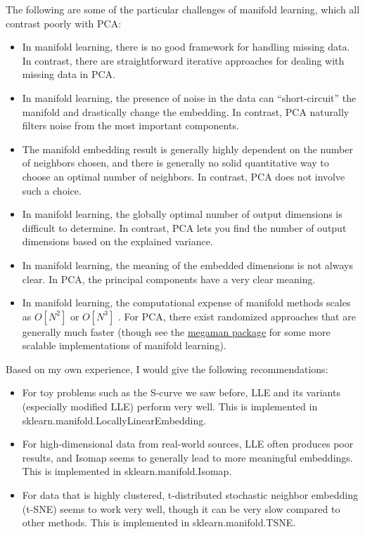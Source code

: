 The following are some of the particular challenges of manifold learning, which all
contrast poorly with PCA:
\begin{itemize}
    \item In manifold learning, there is no good framework for handling missing data. In contrast, there are straightforward iterative approaches for dealing with missing data in PCA.
    \item In manifold learning, the presence of noise in the data can “short-circuit” the manifold and drastically change the embedding. In contrast, PCA naturally filters noise from the most important components.
    \item The manifold embedding result is generally highly dependent on the number of neighbors chosen, and there is generally no solid quantitative way to choose an optimal number of neighbors. In contrast, PCA does not involve such a choice.
    \item In manifold learning, the globally optimal number of output dimensions is difficult to determine. In contrast, PCA lets you find the number of output dimensions based on the explained variance.
    \item In manifold learning, the meaning of the embedded dimensions is not always clear. In PCA, the principal components have a very clear meaning.
    \item In manifold learning, the computational expense of manifold methods scales as $O[N^2]$ or $O[N^3]$ . For PCA, there exist randomized approaches that are generally much faster (though see the \href{https://github.com/mmp2/megaman}{megaman package} for some more scalable implementations of manifold learning).
\end{itemize}

Based on my own experience, I would give the following recommendations:

\begin{itemize}
    \item For toy problems such as the S-curve we saw before, LLE and its variants (especially modified LLE) perform very well. This is implemented in sklearn.manifold.LocallyLinearEmbedding.
    \item For high-dimensional data from real-world sources, LLE often produces poor results, and Isomap seems to generally lead to more meaningful embeddings. This is implemented in sklearn.manifold.Isomap.
    \item For data that is highly clustered, t-distributed stochastic neighbor embedding (t-SNE) seems to work very well, though it can be very slow compared to other methods. This is implemented in sklearn.manifold.TSNE.
\end{itemize}
